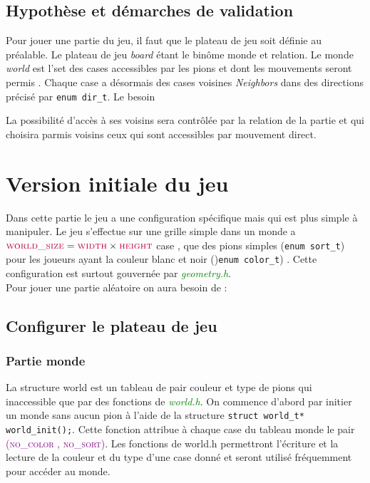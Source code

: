 \documentclass[a4paper]{article}
\begin{document}
\subsection{Hypothèse et démarches de validation}

Pour jouer une partie du jeu, il faut que le plateau de jeu soit définie au préalable. Le plateau de jeu \textit{board}  étant le binôme monde et relation. 
Le monde \textit{world} est l’set des cases accessibles par les pions et dont les mouvements seront permis . Chaque case a désormais des cases voisines \textit{Neighbors} dans des directions précisé par \lstinline|enum dir_t|.
Le besoin 

La possibilité d’accès à ses voisins sera contrôlée par la relation de la partie et qui choisira parmis voisins ceux qui sont accessibles par mouvement direct.  
\section{Version initiale du jeu}
Dans cette partie le jeu a une configuration spécifique mais qui est plus simple à manipuler. Le jeu s’effectue sur une grille simple dans un monde a $\textcolor{purple}{\textsc{world\_size}} = \textcolor{purple}{\textsc{width}} \times \textcolor{purple}{\textsc{height}}$  case , que des pions simples (\lstinline|enum sort_t|) pour les joueurs ayant la couleur blanc et noir ()\lstinline|enum color_t|) . Cette configuration est surtout gouvernée par \textcolor{green}{\textit{geometry.h}}. \\
Pour jouer une partie aléatoire on aura besoin de :
\subsection{Configurer le plateau de jeu}
\subsubsection{Partie monde}
La structure world est un tableau de pair couleur et type de pions qui inaccessible que par des fonctions de \textcolor{green}{\textit{world.h}}. On commence d’abord par initier un monde sans aucun pion à l’aide de la structure \lstinline|struct world_t* world_init();|. Cette fonction attribue à chaque case du tableau monde le pair \textcolor{purple}{\textsc{(no\_color , no\_sort)}}. Les fonctions de world.h permettront l’écriture et la lecture de la couleur et du type d’une case donné et seront utilisé fréquemment pour accéder au monde.  
\end{document}
